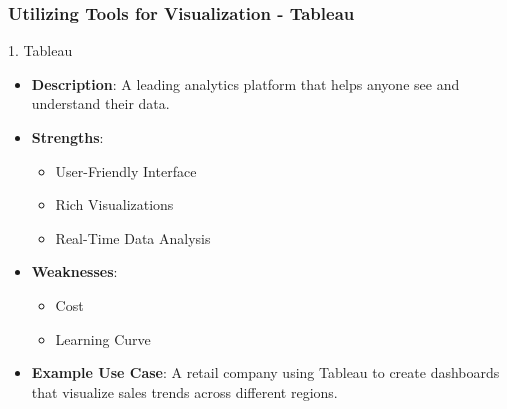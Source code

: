 \documentclass[aspectratio=169]{beamer}
\begin{document}
\begin{frame}[fragile]
    \frametitle{Utilizing Tools for Visualization - Tableau}
    \begin{block}{1. Tableau}
        \begin{itemize}
            \item \textbf{Description}: A leading analytics platform that helps anyone see and understand their data.
            \item \textbf{Strengths}:
            \begin{itemize}
                \item User-Friendly Interface
                \item Rich Visualizations
                \item Real-Time Data Analysis
            \end{itemize}
            \item \textbf{Weaknesses}:
            \begin{itemize}
                \item Cost
                \item Learning Curve
            \end{itemize}
            \item \textbf{Example Use Case}: A retail company using Tableau to create dashboards that visualize sales trends across different regions.
        \end{itemize}
    \end{block}
\end{frame}
\end{document}
